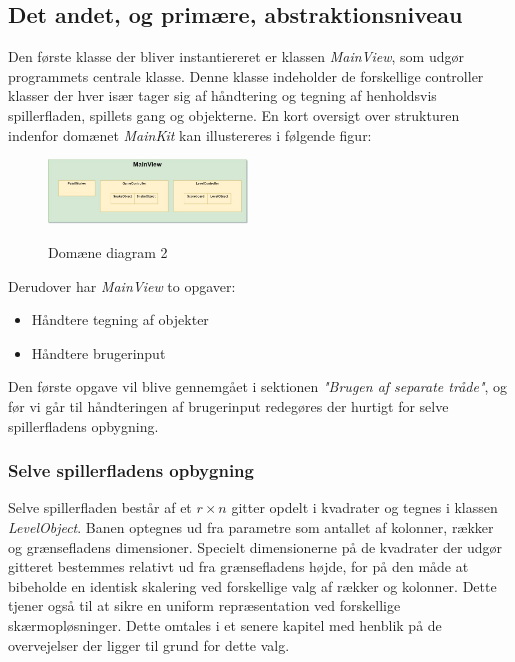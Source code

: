 \documentclass[]{article}
\begin{document}
	\subsection{Det andet, og primære, abstraktionsniveau}
	Den første klasse der bliver instantiereret er klassen \textit{MainView}, som udgør programmets centrale klasse. Denne klasse indeholder de forskellige controller klasser der hver især tager sig af håndtering og tegning af henholdsvis spillerfladen, spillets gang og objekterne. En kort oversigt over strukturen indenfor domænet \textit{MainKit} kan illustereres i følgende figur:
	
	\begin{figure}[h!]
		\centering
		\includegraphics[width=200px]{Domain_diagram.jpg}
		\label{fig:diagram2}
		\caption{Domæne diagram 2}
	\end{figure}
	
	Derudover har \textit{MainView} to opgaver:
	\begin{itemize}
		\item Håndtere tegning af objekter
		\item Håndtere brugerinput
	\end{itemize}
	
	Den første opgave vil blive gennemgået i sektionen \textit{"Brugen af separate tråde"}, og før vi går til håndteringen af brugerinput redegøres der hurtigt for selve spillerfladens opbygning.
	
	\subsubsection{Selve spillerfladens opbygning}
	
	Selve spillerfladen består af et $r \times n$ gitter opdelt i kvadrater og tegnes i klassen \textit{LevelObject}. Banen optegnes ud fra parametre som antallet af kolonner, rækker og grænsefladens dimensioner. Specielt dimensionerne på de kvadrater der udgør gitteret bestemmes relativt ud fra grænsefladens højde, for på den måde at bibeholde en identisk skalering ved forskellige valg af rækker og kolonner. Dette tjener også til at sikre en uniform repræsentation ved forskellige skærmopløsninger. Dette omtales i et senere kapitel med henblik på de overvejelser der ligger til grund for dette valg.
	
\end{document}
